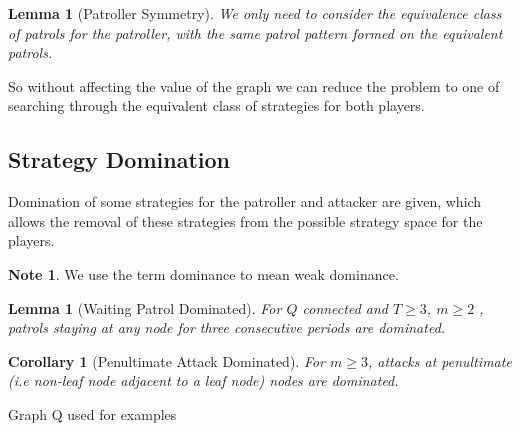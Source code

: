 \documentclass[a4paper,10pt]{article}
\newtheorem{corollary}[theorem]{Corollary}
\newtheorem{lemma}[theorem]{Lemma}
\theoremstyle{definition}
\theoremstyle{definition}
\theoremstyle{remark}
\theoremstyle{definition}
\newtheorem*{note}{Note}
\begin{document}
\begin{lemma}[Patroller Symmetry]
We only need to consider the equivalence class of patrols for the patroller, with the same patrol pattern formed on the equivalent patrols.
\end{lemma}

So without affecting the value of the graph we can reduce the problem to one of searching through the equivalent class of strategies for both players.

\subsection{Strategy Domination}
Domination of some strategies for the patroller and attacker are given, which allows the removal of these strategies from the possible strategy space for the players.

\begin{note}
We use the term dominance to mean weak dominance.
\end{note}

\begin{lemma}[Waiting Patrol Dominated]
For $Q$ connected and $T \geq 3$, $m \geq 2$ , patrols staying at any node for three consecutive periods are dominated.
\end{lemma}

\begin{corollary}[Penultimate Attack Dominated]
For $m \geq 3$, attacks at penultimate (i.e non-leaf node adjacent to a leaf node) nodes are dominated.
\end{corollary}

\begin{myfigure}
\begin{center}
\end{center}
\caption{Graph Q used for examples}
\label{fig: Q}
\end{myfigure}
\end{document}
